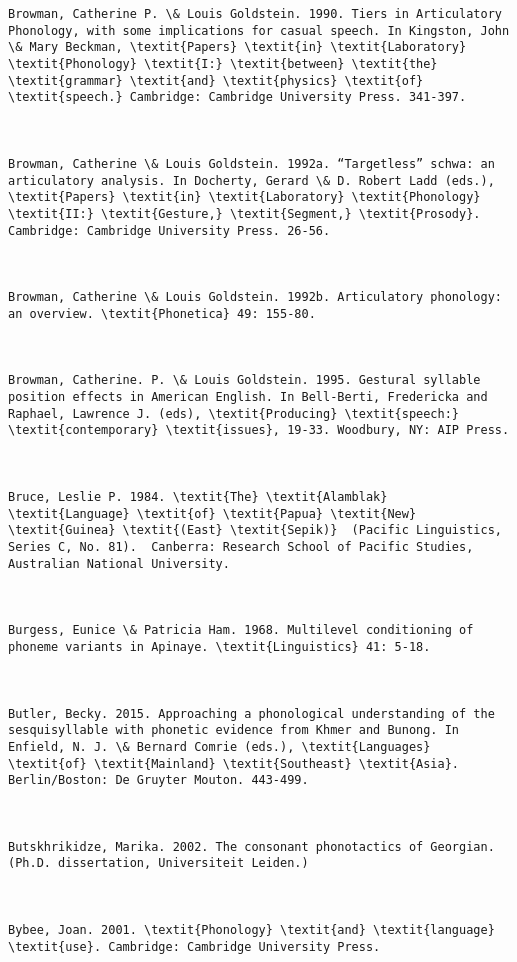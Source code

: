 \begin{verbatim}
Browman, Catherine P. \& Louis Goldstein. 1990. Tiers in Articulatory Phonology, with some implications for casual speech. In Kingston, John \& Mary Beckman, \textit{Papers} \textit{in} \textit{Laboratory} \textit{Phonology} \textit{I:} \textit{between} \textit{the} \textit{grammar} \textit{and} \textit{physics} \textit{of} \textit{speech.} Cambridge: Cambridge University Press. 341-397.



Browman, Catherine \& Louis Goldstein. 1992a. “Targetless” schwa: an articulatory analysis. In Docherty, Gerard \& D. Robert Ladd (eds.), \textit{Papers} \textit{in} \textit{Laboratory} \textit{Phonology} \textit{II:} \textit{Gesture,} \textit{Segment,} \textit{Prosody}. Cambridge: Cambridge University Press. 26-56.



Browman, Catherine \& Louis Goldstein. 1992b. Articulatory phonology: an overview. \textit{Phonetica} 49: 155-80.



Browman, Catherine. P. \& Louis Goldstein. 1995. Gestural syllable position effects in American English. In Bell-Berti, Fredericka and Raphael, Lawrence J. (eds), \textit{Producing} \textit{speech:} \textit{contemporary} \textit{issues}, 19-33. Woodbury, NY: AIP Press.



Bruce, Leslie P. 1984. \textit{The} \textit{Alamblak} \textit{Language} \textit{of} \textit{Papua} \textit{New} \textit{Guinea} \textit{(East} \textit{Sepik)}  (Pacific Linguistics, Series C, No. 81).  Canberra: Research School of Pacific Studies, Australian National University.



Burgess, Eunice \& Patricia Ham. 1968. Multilevel conditioning of phoneme variants in Apinaye. \textit{Linguistics} 41: 5-18.



Butler, Becky. 2015. Approaching a phonological understanding of the sesquisyllable with phonetic evidence from Khmer and Bunong. In Enfield, N. J. \& Bernard Comrie (eds.), \textit{Languages} \textit{of} \textit{Mainland} \textit{Southeast} \textit{Asia}. Berlin/Boston: De Gruyter Mouton. 443-499.



Butskhrikidze, Marika. 2002. The consonant phonotactics of Georgian. (Ph.D. dissertation, Universiteit Leiden.)



Bybee, Joan. 2001. \textit{Phonology} \textit{and} \textit{language} \textit{use}. Cambridge: Cambridge University Press.




\end{verbatim}
